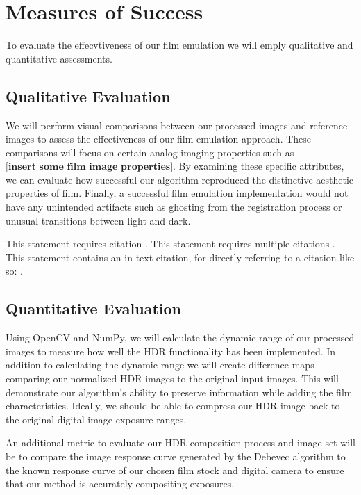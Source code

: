 \documentclass[
	a4paper, %
	10pt, %
	unnumberedsections, %
	twoside, %
]{LTJournalArticle}
\begin{document}
\section{Measures of Success}
To evaluate the effecvtiveness of our film emulation we will emply qualitative and quantitative assessments. 

\subsection{Qualitative Evaluation}
We will perform visual comparisons between our processed images and reference images to assess the effectiveness of our film emulation approach. These comparisons will focus on certain analog imaging properties such as $\textbf{[insert some film image properties]}$. By examining these specific attributes, we can evaluate how successful our algorithm reproduced the distinctive aesthetic properties of film. Finally, a successful film emulation implementation would not have any unintended artifacts such as ghosting from the registration process or unusual transitions between light and dark.

This statement requires citation \autocite{Smith:2023qr}. This statement requires multiple citations \autocite{Smith:2023qr, Smith:2024jd}. This statement contains an in-text citation, for directly referring to a citation like so: \textcite{Smith:2024jd}.

\subsection{Quantitative Evaluation}

Using OpenCV and NumPy, we will calculate the dynamic range of our processed images to measure how well the HDR functionality has been implemented. 
In addition to calculating the dynamic range we will create difference maps comparing our normalized HDR images to the original input images. This will demonstrate our algorithm’s ability to preserve information while adding the film characteristics. Ideally, we should be able to compress our HDR image back to the original digital image exposure ranges.
 
An additional metric to evaluate our HDR composition process and image set will be to compare the image response curve generated by the Debevec algorithm to the known response curve of our chosen film stock and digital camera to ensure that our method is accurately compositing exposures.
\end{document}
